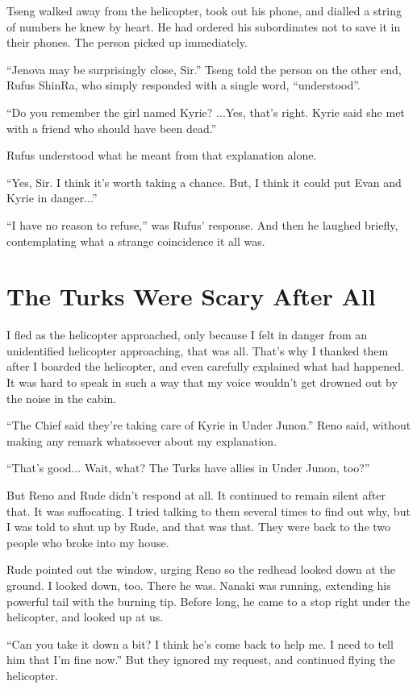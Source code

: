\documentclass[oneside]{book}
\begin{document}
Tseng walked away from the helicopter, took out his phone, and dialled a string of numbers he knew by heart. He had ordered his subordinates not to save it in their phones. The person picked up immediately.

“Jenova may be surprisingly close, Sir.” Tseng told the person on the other end, Rufus ShinRa, who simply responded with a single word, “understood”.

“Do you remember the girl named Kyrie? ...Yes, that’s right. Kyrie said she met with a friend who should have been dead.”

Rufus understood what he meant from that explanation alone.

“Yes, Sir. I think it’s worth taking a chance. But, I think it could put Evan and Kyrie in danger...”

“I have no reason to refuse,” was Rufus’ response. And then he laughed briefly, contemplating what a strange coincidence it all was.

\chapter{The Turks Were Scary After All}
I fled as the helicopter approached, only because I felt in danger from an unidentified helicopter approaching, that was all. That’s why I thanked them after I boarded the helicopter, and even carefully explained what had happened. It was hard to speak in such a way that my voice wouldn’t get drowned out by the noise in the cabin.

“The Chief said they’re taking care of Kyrie in Under Junon.” Reno said, without making any remark whatsoever about my explanation.

“That’s good... Wait, what? The Turks have allies in Under Junon, too?”

But Reno and Rude didn’t respond at all. It continued to remain silent after that. It was suffocating. I tried talking to them several times to find out why, but I was told to shut up by Rude, and that was that. They were back to the two people who broke into my house.

Rude pointed out the window, urging Reno so the redhead looked down at the ground. I looked down, too. There he was. Nanaki was running, extending his powerful tail with the burning tip. Before long, he came to a stop right under the helicopter, and looked up at us.

“Can you take it down a bit? I think he’s come back to help me. I need to tell him that I’m fine now.” But they ignored my request, and continued flying the helicopter.
\end{document}
